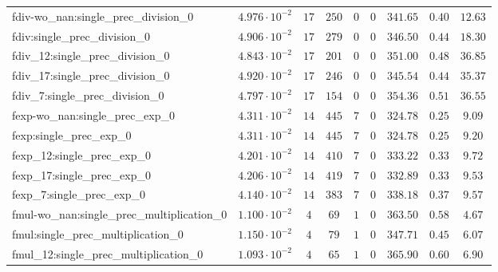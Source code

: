 \begin{tabular}{|l|c|c|c|c|c|c|c|c|}
fdiv-wo\_nan:single\_prec\_division\_0         & $ 4.976 \cdot 10^{-2} $ & $ 17     $ & $ 250    $ & $ 0   $ & $ 0   $ & $ 341.65      $ & $ 0.40    $ & $ 12.63   $ \\
fdiv:single\_prec\_division\_0                 & $ 4.906 \cdot 10^{-2} $ & $ 17     $ & $ 279    $ & $ 0   $ & $ 0   $ & $ 346.50      $ & $ 0.44    $ & $ 18.30   $ \\
fdiv\_12:single\_prec\_division\_0             & $ 4.843 \cdot 10^{-2} $ & $ 17     $ & $ 201    $ & $ 0   $ & $ 0   $ & $ 351.00      $ & $ 0.48    $ & $ 36.85   $ \\
fdiv\_17:single\_prec\_division\_0             & $ 4.920 \cdot 10^{-2} $ & $ 17     $ & $ 246    $ & $ 0   $ & $ 0   $ & $ 345.54      $ & $ 0.44    $ & $ 35.37   $ \\
fdiv\_7:single\_prec\_division\_0              & $ 4.797 \cdot 10^{-2} $ & $ 17     $ & $ 154    $ & $ 0   $ & $ 0   $ & $ 354.36      $ & $ 0.51    $ & $ 36.55   $ \\
fexp-wo\_nan:single\_prec\_exp\_0              & $ 4.311 \cdot 10^{-2} $ & $ 14     $ & $ 445    $ & $ 7   $ & $ 0   $ & $ 324.78      $ & $ 0.25    $ & $ 9.09    $ \\
fexp:single\_prec\_exp\_0                      & $ 4.311 \cdot 10^{-2} $ & $ 14     $ & $ 445    $ & $ 7   $ & $ 0   $ & $ 324.78      $ & $ 0.25    $ & $ 9.20    $ \\
fexp\_12:single\_prec\_exp\_0                  & $ 4.201 \cdot 10^{-2} $ & $ 14     $ & $ 410    $ & $ 7   $ & $ 0   $ & $ 333.22      $ & $ 0.33    $ & $ 9.72    $ \\
fexp\_17:single\_prec\_exp\_0                  & $ 4.206 \cdot 10^{-2} $ & $ 14     $ & $ 419    $ & $ 7   $ & $ 0   $ & $ 332.89      $ & $ 0.33    $ & $ 9.53    $ \\
fexp\_7:single\_prec\_exp\_0                   & $ 4.140 \cdot 10^{-2} $ & $ 14     $ & $ 383    $ & $ 7   $ & $ 0   $ & $ 338.18      $ & $ 0.37    $ & $ 9.57    $ \\
fmul-wo\_nan:single\_prec\_multiplication\_0   & $ 1.100 \cdot 10^{-2} $ & $ 4      $ & $ 69     $ & $ 1   $ & $ 0   $ & $ 363.50      $ & $ 0.58    $ & $ 4.67    $ \\
fmul:single\_prec\_multiplication\_0           & $ 1.150 \cdot 10^{-2} $ & $ 4      $ & $ 79     $ & $ 1   $ & $ 0   $ & $ 347.71      $ & $ 0.45    $ & $ 6.07    $ \\
fmul\_12:single\_prec\_multiplication\_0       & $ 1.093 \cdot 10^{-2} $ & $ 4      $ & $ 65     $ & $ 1   $ & $ 0   $ & $ 365.90      $ & $ 0.60    $ & $ 6.90    $ \\

\end{tabular}
